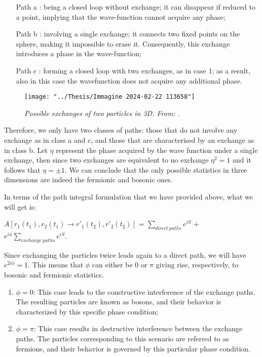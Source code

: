 \documentclass{Configuration_Files/PoliMi3i_thesis}
\begin{document}


\begin{enumerate}
	\item[Path a]: being a closed loop without exchange; it can disappear if reduced to a point, implying that the wave-function cannot acquire any phase; 
	
	\item[Path b] : involving a single exchange; it connects two fixed points on the sphere, making it impossible to erase it. Consequently, this exchange introduces a phase in the wave-function;
	
	\item[Path c] : forming a closed loop with two exchanges, as in case 1; as a result, also in this case the wavefunction does not acquire any additional phase.
\end{enumerate}

\begin{figure}
	\centering
	\texttt{[image: "../Thesis/Immagine 2024-02-22 113658"]}
	\caption{\textit{ Possible exchanges of two particles in 3D. From: \cite{Rao16}.}}
	\label{fig:immagine-2024-02-22-113658}
\end{figure}

Therefore, we only have two classes of paths: those that do not involve any exchange as in class a and c, and those that are characterised by an exchange as in class b.\newline
Let $\eta$ represent the phase acquired by the wave function under a single exchange, then since two exchanges are equivalent to no exchange $\eta^2=1$ and it follows that $\eta = \pm 1 $. We can conclude that the only possible statistics in three dimensions are indeed the fermionic and bosonic ones.\newline

In terms of the path integral formulation that we have provided above, what we will get is:

\begin{center}
	$A[r_1(t_1),r_2(t_1) \rightarrow r'_1(t_2),r'_2(t_2)]$ = $\sum_{direct \ paths} e^{iS}$ + $e^{i \phi} \sum_{exchange \ paths} e^{iS}$.
\end{center}

Since exchanging the particles twice leads again to a direct path, we will have $e^{2i \phi} = 1$. This means that $\phi$ can either be 0 or $\pi$ giving rise, respectively, to bosonic and fermionic statistics. 

\begin{enumerate}
	\item $\phi = 0$: This case leads to the constructive interference of the exchange paths. The resulting particles are known as bosons, and their behavior is characterized by this specific phase condition;
	
	\item $\phi = \pi$: This case results in destructive interference between the exchange paths. The particles corresponding to this scenario are referred to as fermions, and their behavior is governed by this particular phase condition.
\end{enumerate}
\end{document}
